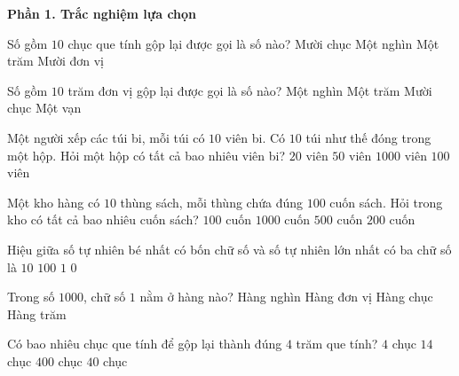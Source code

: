\textbf{Phần 1. Trắc nghiệm lựa chọn}

\begin{ex} %
Số gồm $10$ chục que tính gộp lại được gọi là số nào?
\choice
{Mười chục}
{Một nghìn}
{\True Một trăm}
{Mười đơn vị}
\end{ex}

\begin{ex} %
Số gồm $10$ trăm đơn vị gộp lại được gọi là số nào?
\choice
{\True Một nghìn}
{Một trăm}
{Mười chục}
{Một vạn}
\end{ex}

\begin{ex} %
Một người xếp các túi bi, mỗi túi có $10$ viên bi. Có $10$ túi như thế đóng trong một hộp. Hỏi một hộp có tất cả bao nhiêu viên bi?
\choice
{$20$ viên}
{$50$ viên}
{$1 000$ viên}
{\True $100$ viên}
\end{ex}

\begin{ex} %
Một kho hàng có $10$ thùng sách, mỗi thùng chứa đúng $100$ cuốn sách. Hỏi trong kho có tất cả bao nhiêu cuốn sách?
\choice
{$100$ cuốn}
{\True $1 000$ cuốn}
{$500$ cuốn}
{$200$ cuốn}
\end{ex}

\begin{ex} %
Hiệu giữa số tự nhiên bé nhất có bốn chữ số và số tự nhiên lớn nhất có ba chữ số là
\choice
{$10$}
{$100$}
{\True $1$}
{$0$}
\end{ex}

\begin{ex} %
Trong số $1 000$, chữ số $1$ nằm ở hàng nào?
\choice
{\True Hàng nghìn}
{Hàng đơn vị}
{Hàng chục}
{Hàng trăm}
\end{ex}

\begin{ex} %
Có bao nhiêu chục que tính để gộp lại thành đúng $4$ trăm que tính?
\choice
{$4$ chục}
{$14$ chục}
{$400$ chục}
{\True $40$ chục}
\end{ex}

